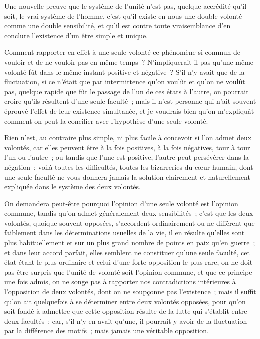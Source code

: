 \documentclass[french,twoside]{book} %
\newcommand\chaptercont{} %
\begin{document}
\chaptercont
\noindent Une nouvelle preuve que le système de l’unité n’est pas, quelque accrédité qu’il soit, le vrai système de l’homme, c’est qu’il existe en nous une double volonté comme une double sensibilité, et qu’il est contre toute vraisemblance d’en conclure l’existence d’un être simple et unique.\par
Comment rapporter en effet à une seule volonté ce phénomène si commun de vouloir et de ne vouloir pas en même temps ? N’impliquerait-il pas qu’une même volonté fût dans le même instant positive et négative ? S’il n’y avait que de la fluctuation, si ce n’était que par intermittence qu’on voulût et qu’on ne voulût pas, quelque rapide que fût le passage de l’un de ces états à l’autre, on pourrait croire qu’ils résultent d’une seule faculté ; mais il n’est personne qui n’ait souvent éprouvé l’effet de leur existence simultanée, et je voudrais bien qu’on m’expliquât comment on peut la concilier avec l’hypothèse d’une seule volonté.\par
Rien n’est, au contraire plus simple, ni plus facile à concevoir si l’on admet deux volontés, car elles peuvent être à la fois positives, à la fois négatives, tour à tour l’un ou l’autre ; ou tandis que l’une est positive, l’autre peut persévérer dans la négation : voilà toutes les difficultés, toutes les bizarreries du cœur humain, dont une seule faculté ne vous donnera jamais la solution clairement et naturellement expliquée dans le système des deux volontés.\par
On demandera peut-être pourquoi l’opinion d’une seule volonté est l’opinion commune, tandis qu’on admet généralement deux sensibilités ; c’est que les deux volontés, quoique souvent opposées, s’accordent ordinairement ou ne diffèrent que faiblement dans les déterminations usuelles de la vie, il en résulte qu’elles sont plus habituellement et sur un plus grand nombre de points en paix qu’en guerre ; et dans leur accord parfait, elles semblent ne constituer qu’une seule faculté, cet état étant le plus ordinaire et celui d’une forte opposition le plus rare, on ne doit pas être surpris que l’unité de volonté soit l’opinion commune, et que ce principe une fois admis, on ne songe pas à rapporter nos contradictions intérieures à l’opposition de deux volontés, dont on ne soupçonne pas l’existence ; mais il suffit qu’on ait quelquefois à se déterminer entre deux volontés opposées, pour qu’on soit fondé à admettre que cette opposition résulte de la lutte qui s’établit entre deux facultés ; car, s’il n’y en avait qu’une, il pourrait y avoir de la fluctuation par la différence des motifs ; mais jamais une véritable opposition.\par
\end{document}
